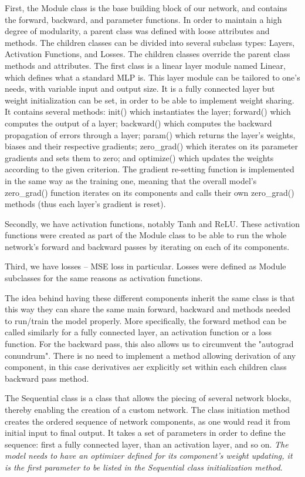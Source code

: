 \documentclass[10pt, a4paper]{article}
\begin{document}
First, the Module class is the base building block of our network, and contains the forward, backward, and parameter functions. In order to maintain a high degree of modularity, a parent class was defined with loose attributes and methods. The children classes can be divided into several subclass types: Layers, Activation Functions, and Losses. The children classes override the parent class methods and attributes.
The first class is a linear layer module named Linear, which defines what a standard MLP is. This layer module can be tailored to one's needs, with variable input and output size. It is a fully connected layer but weight initialization can be set, in order to be able to implement weight sharing. 
It contains several methods: init() which instantiates the layer; forward() which computes the output of a layer; backward() which computes the backward propagation of errors through a layer; param() which returns the layer's weights, biases and their respective gradients; zero\_grad() which iterates on its parameter gradients and sets them to zero; and optimize() which updates the weights according to the given criterion.
The gradient re-setting function is implemented in the same way as the training one, meaning that the overall model's zero\_grad() function iterates on its components and calls their own zero\_grad() methods (thus each layer's gradient is reset).

Secondly, we have activation functions, notably Tanh and ReLU. These activation functions were created as part of the Module class to be able to run the whole network's forward and backward passes by iterating on each of its components.

Third, we have losses -- MSE loss in particular. Losses were defined as Module subclasses for the same reasons as activation functions.

The idea behind having these different components inherit the same class is that this way they can share the same main forward, backward and methods needed to run/train the model properly. More specifically, the forward method can be called similarly for a fully connected layer, an activation function or a loss function.
For the backward pass, this also allows us to circumvent the "autograd conundrum". There is no need to implement a method allowing derivation of any component, in this case derivatives aer explicitly set within each children class backward pass method.

The Sequential class is a class that allows the piecing of several network blocks, thereby enabling the creation of a custom network. The class initiation method creates the ordered sequence of network components, as one would read it from initial input to final output. It takes a set of parameters in order to define the sequence: first a fully connected layer, than an activation layer, and so on. \textit{The model needs to have an optimizer defined for its component's weight updating, it is the first parameter to be listed in the Sequential class initialization method}.
\end{document}
